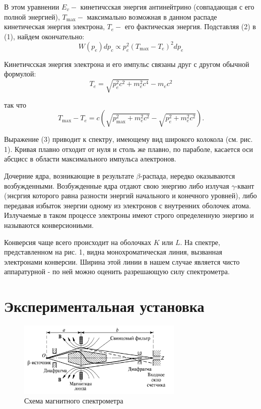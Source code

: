 \documentclass[a4paper, 12pt]{article}
\begin{document}
В этом уравнении $E_v-$ кинетичсская энергия антинейтрино (совпадающая с его полной энергией), $T_{\max }-$ максимально возможная в данном распаде кинетическая энергия электрона, $T_e-$ его фактическая энергия. Подставляя (2) в (1), найдем окончательно:
\begin{equation}
W\left(p_e\right) d p_c \propto p_e^2\left(T_{\max }-T_e\right)^2 d p_e
\end{equation}

Кинетичсская энергия электрона и его импульс связаны друг с другом обычной формулой:
\begin{equation}
T_e=\sqrt{p_e^2 c^2+m_e^2 c^4}-m_e c^2
\end{equation}

так что
\begin{equation}
T_{\max }-T_e=c\left(\sqrt{p_{\max }^2+m_e^2 c^2}-\sqrt{p_e^2+m_e^2 c^2}\right) .
\end{equation}

Выражение (3) приводит к спектру, имеющему вид широкого колокола (см. рис. 1). Кривая плавно отходит от нуля и столь же плавно, по параболе, касается оси абсцисс в области максимального импульса әлектронов.

Дочерние ядра, возникающие в результате $\beta$-распада, нередко оказываются возбужденными. Возбужденные ядра отдают свою энергию либо излучая $\gamma$-квант (энсргия которого равна разности энергий начального и конечного уровней), либо передавая избыток энергии одному из электронов с внутренних оболочек атома. Излучаемые в таком процессе электроны имеют строго определенную энергию и называются конверсиониьми.

Конверсия чаще всего происходит на оболочках $K$ или $L$. На спектре, представленном на рис. 1, видна монохроматическая линия, вызванная электронами конверсии. Ширина этой линии в нашем случае является чисто аппаратурной - по ней можно оценить разрешающую силу спектрометра.

\section{Экспериментальная установка}

\begin{figure}[H]
    \centering
    \includegraphics[width=0.7\textwidth]{set1.png}
    \caption{Схема магнитного спектрометра}
    \label{fig:set1}
\end{figure}
\end{document}
